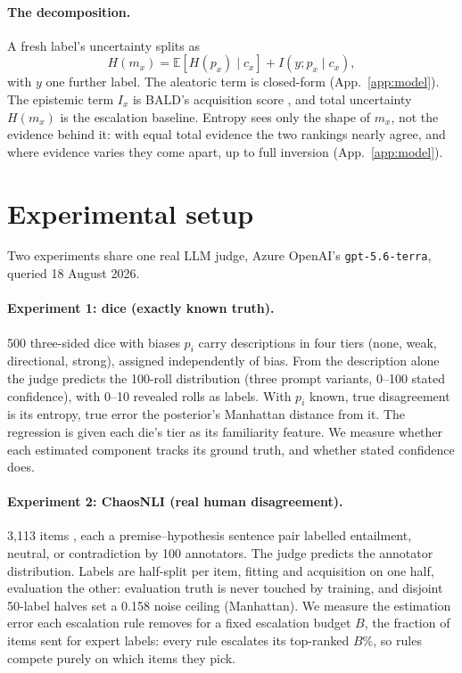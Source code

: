 \documentclass{article}
\begin{document}
\paragraph{The decomposition.}
A fresh label's uncertainty splits as
\begin{equation*}
  H(m_x) = \mathbb{E}[H(p_x) \mid c_x] + I(y; p_x \mid c_x),
\end{equation*}
with $y$ one further label. The aleatoric term is closed-form
(App.~\ref{app:model}). The epistemic term $I_x$ is BALD's acquisition score
\citep{houlsby2011}, and total uncertainty $H(m_x)$ is the escalation baseline.
Entropy sees only the shape of $m_x$, not the evidence behind it: with equal
total evidence the two rankings nearly agree, and where evidence varies they
come apart, up to full inversion (App.~\ref{app:model}).

\section{Experimental setup}
\label{sec:setup}

Two experiments share one real LLM judge, Azure OpenAI's \texttt{gpt-5.6-terra},
queried 18 August 2026.

\paragraph{Experiment 1: dice (exactly known truth).}
500 three-sided dice with biases $p_i$ carry descriptions in four tiers (none,
weak, directional, strong), assigned independently of bias. From the description
alone the judge predicts the 100-roll distribution (three prompt variants,
0--100 stated confidence), with 0--10 revealed rolls as labels. With $p_i$ known,
true disagreement is its entropy, true error the posterior's Manhattan
distance from it. The regression is given each die's tier as its familiarity
feature. We measure whether each estimated component tracks its ground truth, and
whether stated confidence does.

\paragraph{Experiment 2: ChaosNLI (real human disagreement).}
3,113 items \citep{nie2020}, each a premise--hypothesis sentence pair labelled
entailment, neutral, or contradiction by 100 annotators. The judge predicts the
annotator distribution. Labels are half-split per item,
fitting and acquisition on one half, evaluation the other: evaluation truth is
never touched by training, and disjoint 50-label halves set a 0.158 noise ceiling
(Manhattan). We measure the estimation error each escalation rule removes for a fixed
escalation budget $B$, the fraction of items sent for expert labels: every rule
escalates its top-ranked $B\%$, so rules compete purely on which items they pick.
\end{document}
